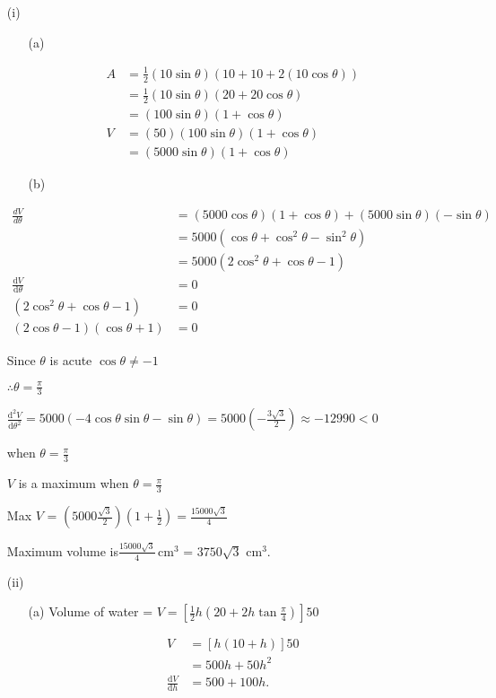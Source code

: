 \item {}
\begin{enumerate}
\item[(i)]  {}
\begin{enumerate}
\item[(a)]  {}

\begin{align*}
A & =\frac{1}{2}(10\sin\theta)(10+10+2(10\cos\theta))\\
 & =\frac{1}{2}(10\sin\theta)(20+20\cos\theta)\\
 & =(100\sin\theta)(1+\cos\theta)\\
V & =(50)(100\sin\theta)(1+\cos\theta)\\
 & =(5000\sin\theta)(1+\cos\theta)
\end{align*}

\item[(b)]  
\end{enumerate}
\begin{align*}
\frac{dV}{d\theta} & =(5000\cos\theta)(1+\cos\theta)+(5000\sin\theta)(-\sin\theta)\\
 & =5000(\cos\theta+\cos^{2}\theta-\sin^{2}\theta)\\
 & =5000(2\cos^{2}\theta+\cos\theta-1)\\
\frac{\text{d}V}{\text{d}\theta} & =0\\
(2\cos^{2}\theta+\cos\theta-1) & =0\\
(2\cos\theta-1)(\cos\theta+1) & =0
\end{align*}

Since $\theta$ is acute $\cos\theta\ne-1$

$\therefore\theta=\frac{\pi}{3}$

$\frac{\text{d}^{2}V}{\text{d}\theta^{2}}=5000(-4\cos\theta\sin\theta-\sin\theta)=5000(-\frac{3\sqrt{3}}{2})\approx-12990<0$

when $\theta=\frac{\pi}{3}$

$V$ is a maximum when $\theta=\frac{\pi}{3}$

Max $V$ = $(5000\frac{\sqrt{3}}{2})(1+\frac{1}{2})=\frac{15000\sqrt{3}}{4}$

Maximum volume is$\frac{15000\sqrt{3}}{4}\,\text{cm}^{3}$ = $3750\sqrt{3}\text{ cm}^{3}$. 
\item[(ii)]  {}
\begin{enumerate}
\item[(a)]  Volume of water = $V=[\frac{1}{2}h(20+2h\tan\frac{\pi}{4})]50$

\begin{align*}
V & =[h(10+h)]50\\
 & =500h+50h^{2}\\
\frac{\text{d}V}{\text{d}h} & =500+100h.
\end{align*}


\end{enumerate}
\end{enumerate}

